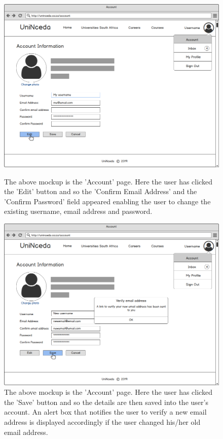 \documentclass[a4paper, 12pt]{article}
\begin{document}
\renewcommand{\figurename}{Step}
\setcounter{figure}{0}

\begin{figure}[H]
\centering
\includegraphics[scale=0.4]{AccountChangingDetails}
\caption{The above mockup is the 'Account' page. Here the user has clicked the 'Edit' button and so the 'Confirm Email Address' and the 'Confirm Password' field appeared enabling the user to change the existing username, email address and password.}
\label{AccountChangingDetails}

\vspace{1cm}

\includegraphics[scale=0.4]{AccountChangingDetailsSave}
\caption{The above mockup is the 'Account' page. Here the user has clicked the 'Save' button and so the details are then saved into the user's account. An alert box that notifies the user to verify a new email address is displayed accordingly if the user changed his/her old email address.}
\label{AccountChangingDetailsSave}
\end{figure}
\end{document}
